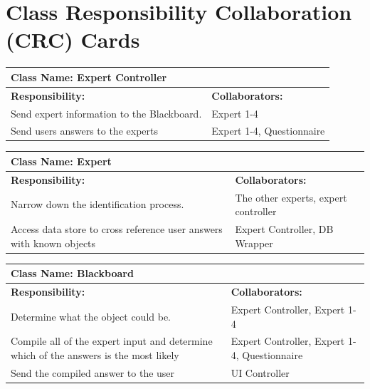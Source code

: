 \documentclass[]{article}
\begin{document}
	
\section{Class Responsibility Collaboration (CRC) Cards}
\label{sec:class_responsibility_collaboration_crc_cards}

    \begin{table}[h!]
		\centering
		\begin{tabular}{|p{5cm}|p{5cm}|}
		\hline 
		 \multicolumn{2}{|l|}{\textbf{Class Name:} Expert Controller} \\
		\hline
		\textbf{Responsibility:} & \textbf{Collaborators:} \\\hline
		Send expert information to the Blackboard. & Expert 1-4\\
		\hline
		Send users answers to the experts & Expert 1-4, Questionnaire\\
		\hline
		\end{tabular}
	\end{table}
	
	\begin{table}[h!]
		\centering
		\begin{tabular}{|p{5cm}|p{5cm}|}
		\hline 
		 \multicolumn{2}{|l|}{\textbf{Class Name:} Expert} \\
		\hline
		\textbf{Responsibility:} & \textbf{Collaborators:} \\
		\hline
		Narrow down the identification process. & The other experts, expert controller\\
		\hline
		Access data store to cross reference user answers with known objects & Expert Controller, DB Wrapper \\
		\hline
		\end{tabular}
	\end{table}
	
	\begin{table}[h!]
		\centering
		\begin{tabular}{|p{5cm}|p{5cm}|}
		\hline 
		 \multicolumn{2}{|l|}{\textbf{Class Name:} Blackboard} \\
		\hline
		\textbf{Responsibility:} & \textbf{Collaborators:} \\\hline
		Determine what the object could be. & Expert Controller, Expert 1-4\\
		\hline
		Compile all of the expert input and determine which of the answers is the most likely & Expert Controller, Expert 1-4, Questionnaire\\
		\hline
		Send the compiled answer to the user & UI Controller \\
		\hline
		\end{tabular}
	\end{table}
	
\end{document}
